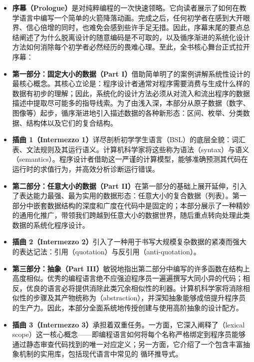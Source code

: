 \begin{itemize}
  \item \textbf{序幕（Prologue）}是对纯粹编程的一次快速领略。它向读者展示了如何在教学语言中编写一个简单的火箭降落动画。完成之后，任何初学者在感到大开眼界、信心倍增的同时，也难免会感到些许手足无措。因此，序幕末尾的要点总结阐述了为什么脱离设计的随意编码是不可取的，以及循序渐进的系统化设计方法如何消除每个初学者必然经历的畏难心理。至此，全书核心舞台正式拉开序幕：
  
  \item \textbf{第一部分：固定大小的数据（Part I）}借助简单明了的案例讲解系统性设计的最核心概念。其核心立论是：程序设计者通常对程序需要消费与生成什么样的数据有初步的理解；因此，系统化的设计方法必须从对流入和流出程序的数据描述中提取尽可能多的指导线索。为了由浅入深，本部分从原子数据（数字、图像等）起步，循序渐进地引入描述数据的各种新形态：区间、枚举、分类数据、结构体以及它们的复合结构。
  
  \item \textbf{插曲 1（Intermezzo 1）}详尽剖析初学学生语言（BSL）的底层全貌：词汇表、文法规则及其运行语义。计算机科学家将这些称为语法（syntax）与语义（semantics）。程序设计者借助这一严谨的计算模型，能够准确预测其代码在运行时的求值行为，并高效分析诊断运行错误。
  
  \item \textbf{第二部分：任意大小的数据（Part II）}在第一部分的基础上展开延伸，引入了表达能力最强、最为实用的数据形态：任意大小的复合数据（列表）。第一部分中嵌套数据结构的深度和广度在代码中是固定的；本部分展示了一种精妙的通用化推广，带领我们跨越到任意大小的数据世界，随后重点转向处理此类数据的系统化程序设计。
  
  \item \textbf{插曲 2（Intermezzo 2）}引入了一种用于书写大规模复杂数据的紧凑而强大的表达记法：引用（quotation）与反引用（anti-quotation）。
  
  \item \textbf{第三部分：抽象（Part III）}敏锐地指出第二部分中编写的许多函数在结构上高度相似。优秀的编程语言绝不应强迫程序员一遍遍撰写大同小异的代码；相反，优良的语言必将提供消除此类冗余相似性的利器。计算机科学家将消除相似性的步骤及其产物统称为（abstraction），并深知抽象能够成倍提升程序员的生产力。因此，本部分全面系统地传授创建与使用高阶抽象的设计配方。
  
  \item \textbf{插曲 3（Intermezzo 3）}承担着双重任务。一方面，它深入阐释了（lexical scope）这一核心概念——即编程语言如何将每个名称严格绑定到程序员能够通过静态审查代码找到的唯一对应定义；另一方面，它介绍了一个包含丰富抽象机制的实用库，包括现代语言中常见的  循环推导式。
  

\end{itemize}
